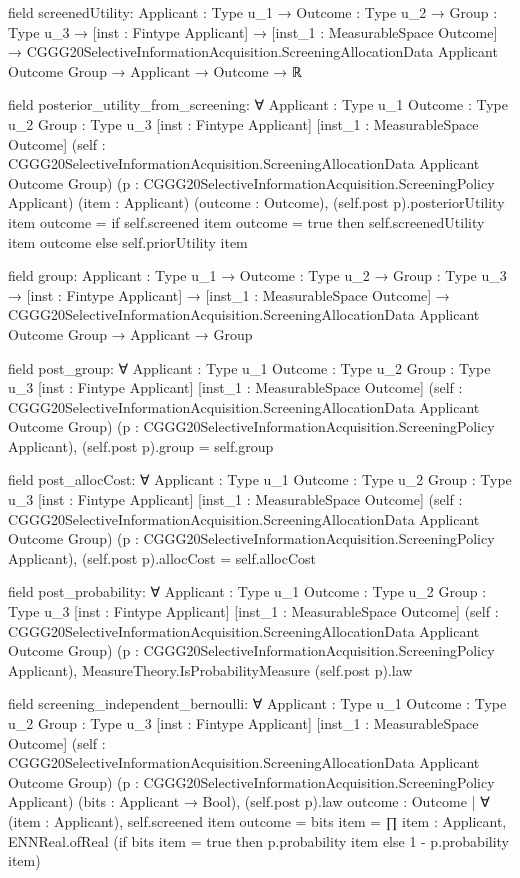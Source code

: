 \documentclass[10pt]{article}
\begin{document}
\begin{ReviewVerbatim}
field screenedUtility:
{Applicant : Type u_1} →
  {Outcome : Type u_2} →
    {Group : Type u_3} →
      [inst : Fintype Applicant] →
        [inst_1 : MeasurableSpace Outcome] →
          CGGG20SelectiveInformationAcquisition.ScreeningAllocationData Applicant Outcome Group →
            Applicant → Outcome → ℝ

field posterior_utility_from_screening:
∀ {Applicant : Type u_1} {Outcome : Type u_2} {Group : Type u_3} [inst : Fintype Applicant]
  [inst_1 : MeasurableSpace Outcome]
  (self : CGGG20SelectiveInformationAcquisition.ScreeningAllocationData Applicant Outcome Group)
  (p : CGGG20SelectiveInformationAcquisition.ScreeningPolicy Applicant) (item : Applicant) (outcome : Outcome),
  (self.post p).posteriorUtility item outcome =
    if self.screened item outcome = true then self.screenedUtility item outcome else self.priorUtility item

field group:
{Applicant : Type u_1} →
  {Outcome : Type u_2} →
    {Group : Type u_3} →
      [inst : Fintype Applicant] →
        [inst_1 : MeasurableSpace Outcome] →
          CGGG20SelectiveInformationAcquisition.ScreeningAllocationData Applicant Outcome Group → Applicant → Group

field post_group:
∀ {Applicant : Type u_1} {Outcome : Type u_2} {Group : Type u_3} [inst : Fintype Applicant]
  [inst_1 : MeasurableSpace Outcome]
  (self : CGGG20SelectiveInformationAcquisition.ScreeningAllocationData Applicant Outcome Group)
  (p : CGGG20SelectiveInformationAcquisition.ScreeningPolicy Applicant), (self.post p).group = self.group

field post_allocCost:
∀ {Applicant : Type u_1} {Outcome : Type u_2} {Group : Type u_3} [inst : Fintype Applicant]
  [inst_1 : MeasurableSpace Outcome]
  (self : CGGG20SelectiveInformationAcquisition.ScreeningAllocationData Applicant Outcome Group)
  (p : CGGG20SelectiveInformationAcquisition.ScreeningPolicy Applicant), (self.post p).allocCost = self.allocCost

field post_probability:
∀ {Applicant : Type u_1} {Outcome : Type u_2} {Group : Type u_3} [inst : Fintype Applicant]
  [inst_1 : MeasurableSpace Outcome]
  (self : CGGG20SelectiveInformationAcquisition.ScreeningAllocationData Applicant Outcome Group)
  (p : CGGG20SelectiveInformationAcquisition.ScreeningPolicy Applicant),
  MeasureTheory.IsProbabilityMeasure (self.post p).law

field screening_independent_bernoulli:
∀ {Applicant : Type u_1} {Outcome : Type u_2} {Group : Type u_3} [inst : Fintype Applicant]
  [inst_1 : MeasurableSpace Outcome]
  (self : CGGG20SelectiveInformationAcquisition.ScreeningAllocationData Applicant Outcome Group)
  (p : CGGG20SelectiveInformationAcquisition.ScreeningPolicy Applicant) (bits : Applicant → Bool),
  (self.post p).law {outcome : Outcome | ∀ (item : Applicant), self.screened item outcome = bits item} =
    ∏ item : Applicant, ENNReal.ofReal (if bits item = true then p.probability item else 1 - p.probability item)


\end{ReviewVerbatim}
\end{document}
